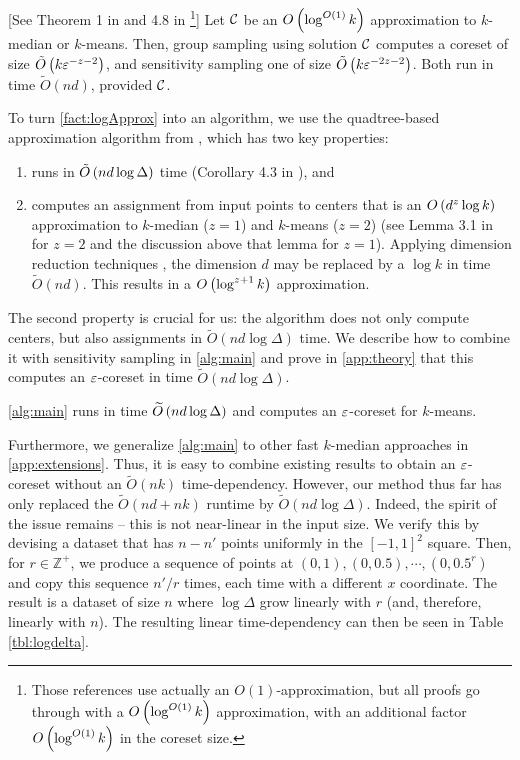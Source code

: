 \begin{fact}\label{fact:logApprox}[See Theorem 1 in \cite{stoc21} and 4.8 in \cite{FeldmanL11}\footnote{Those references use actually an $O(1)$-approximation, but all proofs go through with a  $O\left( \log^{O(1)} k\right)$ approximation, with an additional factor  $O\left( \log^{O(1)} k\right)$ in the coreset size.}]
Let $\mathcal C$ be an $O\left( \log^{O(1)} k\right)$ approximation to $k$-median or $k$-means.
Then, group sampling using solution $\mathcal C$ computes a coreset of size $\tilde O\left(
k \varepsilon^{-z-2}\right)$, and sensitivity sampling one of size $\tilde O\left( k \varepsilon^{-2z-2}\right)$. 
Both run in time $\tilde O(nd)$, provided $\mathcal C$.
\end{fact}

To turn \cref{fact:logApprox} into an algorithm, we use the quadtree-based \fkmeans approximation algorithm from \cite{cohen2020fast}, which has two key
properties: 
\begin{enumerate}
\item \fkmeans runs in $\tilde O\left( n d \log \Delta\right)$ time (Corollary 4.3 in \cite{cohen2020fast}), and
\item \fkmeans computes an assignment from input points to centers that is an $O\left( d^z \log k\right)$ approximation to $k$-median ($z=1$) and $k$-means ($z=2$)
    (see Lemma 3.1 in \cite{cohen2020fast} for $z=2$ and the discussion above that lemma for $z=1$). Applying dimension reduction techniques \cite{MakarychevMR19}, the dimension
    $d$ may be replaced by a $\log k$ in time $\tilde O(nd)$. This results in a $O\left(\log^{z+1} k\right)$ approximation. 
\end{enumerate}

The second property is crucial for us: the algorithm does not only compute centers, but also assignments in $\tilde{O}(nd\log \Delta)$ time.  We describe how to
combine it with sensitivity sampling in \cref{alg:main} and prove in \cref{app:theory} that this computes an $\varepsilon$-coreset in time $\tilde O(nd \log \Delta)$.

\begin{corollary}\label{cor:mainAlg}
\cref{alg:main} runs in time $\widetilde O\left( n d \log \Delta\right)$ and computes an $\varepsilon$-coreset for $k$-means.
\end{corollary}
Furthermore, we generalize \cref{alg:main} to other fast $k$-median approaches in \cref{app:extensions}.
Thus, it is easy to combine existing results to obtain an $\varepsilon$-coreset without an $\widetilde{O}(nk)$ time-dependency.  However, our method thus far has only
replaced the $\widetilde{O}(nd + nk)$ runtime by $\widetilde{O}(nd \log \Delta)$. Indeed, the spirit of the issue remains -- this is not near-linear in the input size.
We verify this by devising a dataset that has $n - n'$ points uniformly in the $[-1, 1]^2$ square. Then, for $r \in \mathbb{Z}^+$, we produce a sequence of
points at $(0, 1), (0, 0.5), \cdots, (0, 0.5^r)$ and copy this sequence $n' / r$ times, each time with a different $x$ coordinate. The result is a dataset of
size $n$ where $\log \Delta$ grow linearly with $r$ (and, therefore, linearly with $n$). The resulting linear time-dependency can then be seen in Table \ref{tbl:logdelta}.

